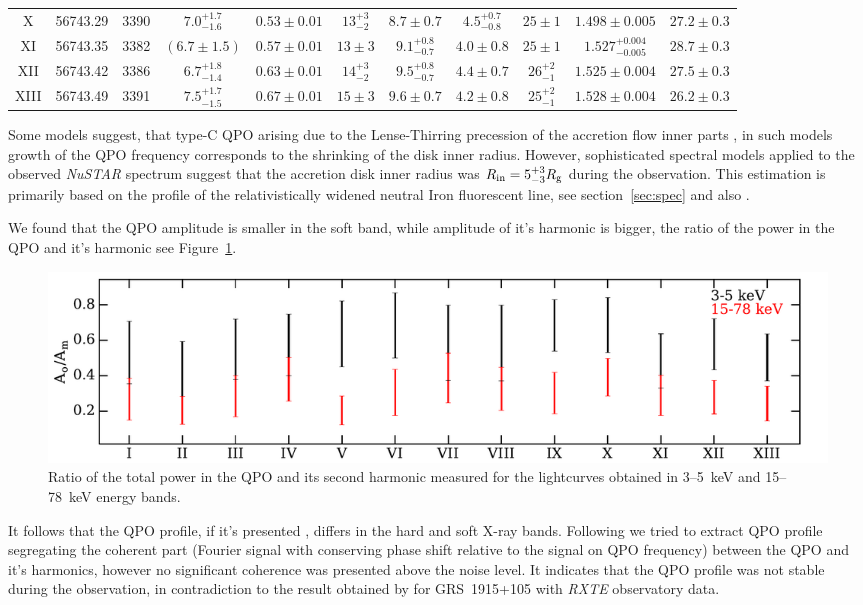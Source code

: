 \documentclass[a4paper,fleqn,usenatbib]{mnras}
\begin{document}
\begin{table}
\begin{tabular}{|c|c|c|c|c|c|c|c|c|c|c|}
X & 56743.29 & 3390 & $7.0_{-1.6}^{+1.7}$ & $0.53\pm0.01$ & $13_{-2}^{+3}$ & $8.7\pm0.7$ & $4.5_{-0.8}^{+0.7}$ & $25\pm1$ & $1.498\pm0.005$ & $27.2\pm0.3$ \\
XI & 56743.35 & 3382 & $(6.7\pm1.5)$ & $0.57\pm0.01$ & $13\pm3$ & $9.1_{-0.7}^{+0.8}$ & $4.0\pm0.8$ & $25\pm1$ & $1.527_{-0.005}^{+0.004}$ & $28.7\pm0.3$ \\
XII & 56743.42 & 3386 & $6.7_{-1.4}^{+1.8}$ & $0.63\pm0.01$ & $14_{-2}^{+3}$ & $9.5_{-0.7}^{+0.8}$ & $4.4\pm0.7$ & $26_{-1}^{+2}$ & $1.525\pm0.004$ & $27.5\pm0.3$ \\
XIII & 56743.49 & 3391 & $7.5_{-1.5}^{+1.7}$ & $0.67\pm0.01$ & $15\pm3$ & $9.6\pm0.7$ & $4.2\pm0.8$ & $25_{-1}^{+2}$ & $1.528\pm0.004$ & $26.2\pm0.3$ \\
\hline
\end{tabular}
\end{table}

Some models suggest, that type-C QPO arising due to the Lense-Thirring precession of the accretion flow inner parts \citep{1998ApJ...492L..59S, 2006ApJ...642..420S, 2009MNRAS.397L.101I}, in such models growth of the QPO frequency corresponds to the shrinking of the disk inner radius.
However, sophisticated spectral models applied to the observed {\it NuSTAR} spectrum suggest that the accretion disk inner radius was $R_{\rm in}= 5_{-3}^{+3}R_{\rm g}$ during the observation.
This estimation is primarily based on the profile of the relativistically widened neutral Iron fluorescent line, see section~\ref{sec:spec} and also \citep{miller15_nust}.

We found that the QPO amplitude is smaller in the soft band, while amplitude of it's harmonic is bigger, the ratio of the power in the QPO and it's harmonic see Figure~\ref{fig:qpo_ratio}.
\begin{figure}
\includegraphics[width=\columnwidth]{QPO_and_harmonic_ratio_ylabel.pdf}
        \caption{Ratio of the total power in the QPO and its second harmonic measured for the lightcurves obtained in 3--5~keV and 15--78~keV energy bands.}
        \label{fig:qpo_ratio}
\end{figure}
It follows that the QPO profile, if it's presented \citep[see, e.g.][]{2015MNRAS.446.3516I}, differs in the hard and soft X-ray bands.
Following \citep{2015MNRAS.446.3516I} we tried to extract QPO profile segregating the coherent part (Fourier signal with conserving phase shift relative to the signal on QPO frequency) between the QPO and it's harmonics, however no significant coherence was presented above the noise level.
It indicates that the QPO profile was not stable during the observation, in contradiction to the result obtained by \citep{2015MNRAS.446.3516I} for GRS~1915+105 with {\it RXTE} observatory data.
\end{document}
